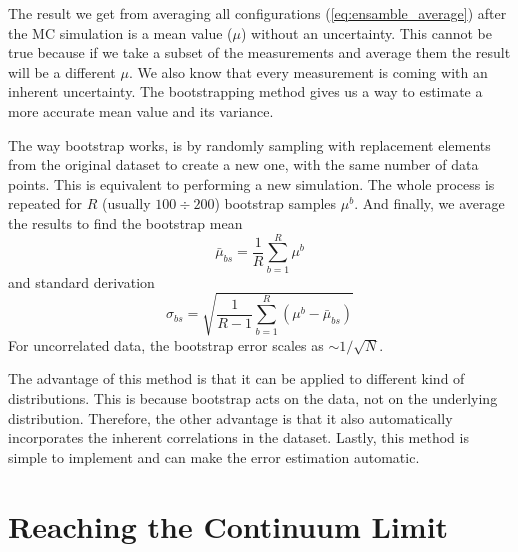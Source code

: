 The result we get from averaging all configurations (\cref{eq:ensamble_average}) after the MC simulation is a mean value ($\mu$) without an uncertainty. This cannot be true because if we take a subset of the measurements and average them the result will be a different $\mu$. We also know that every measurement is coming with an inherent uncertainty. The bootstrapping method gives us a way to estimate a more accurate mean value and its variance.

The way bootstrap works, is by randomly sampling with replacement elements from the original dataset to create a new one, with the same number of data points. This is equivalent to performing a new simulation. The whole process is repeated for $R$ (usually $100\div200$) bootstrap samples $\mu^b$. And finally, we average the results to find the bootstrap mean
\begin{equation}
  \bar{\mu}_{bs} = \frac{1}{R}\sum^R_{b=1} \mu^b
\end{equation}
and standard derivation
\begin{equation}
  \sigma_{bs} = \sqrt{\frac{1}{R-1}\sum^R_{b=1} (\mu^b-\bar{\mu}_{bs})}
\end{equation}
For uncorrelated data, the bootstrap error scales as ${\sim}1/\sqrt{N}$.

The advantage of this method is that it can be applied to different kind of distributions. This is because bootstrap acts on the data, not on the underlying distribution. Therefore, the other advantage is that it also automatically incorporates the inherent correlations in the dataset. Lastly, this method is simple to implement and can make the error estimation automatic.

\section{Reaching the Continuum Limit}
\label{app:limit}

